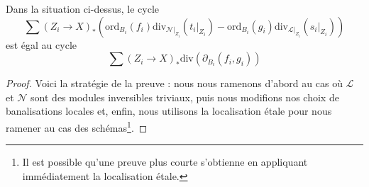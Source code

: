 \begin{lemma}
\label{lemma-key-formula}
Dans la situation ci-dessus, le cycle
$$
\sum
(Z_i \to X)_*\left(
\text{ord}_{B_i}(f_i) \text{div}_{\mathcal{N}|_{Z_i}}(t_i|_{Z_i}) -
\text{ord}_{B_i}(g_i) \text{div}_{\mathcal{L}|_{Z_i}}(s_i|_{Z_i}) \right)
$$
est égal au cycle
$$
\sum (Z_i \to X)_*\text{div}(\partial_{B_i}(f_i, g_i))
$$
\end{lemma}

\begin{proof}
Voici la stratégie de la preuve : nous nous ramenons d'abord au cas où $\mathcal{L}$ et
$\mathcal{N}$ sont des modules inversibles triviaux, puis nous modifions nos choix
de banalisations locales et, enfin, nous utilisons la localisation \'etale pour
nous ramener au cas des schémas\footnote{Il est possible qu'une preuve plus courte
s'obtienne en appliquant immédiatement la localisation \'etale.}.


\end{proof}
